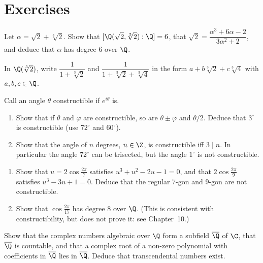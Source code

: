 \section{Exercises}

\begin{exercise}[$\star$]\label{ex:sqrt23}
Let $\alpha=\sqrt2+\sqrt[3]2$. Show that $[\Q(\sqrt2,\sqrt[3]2):\Q]=6$, that $\sqrt2=\dfrac{\alpha^3+6\alpha-2}{3\alpha^2+2}$, and deduce that $\alpha$ has degree $6$ over $\Q$.
\end{exercise}

\begin{exercise}[$\star$]\label{ex:inverse}
In $\Q(\sqrt[3]2)$, write $\dfrac1{1+\sqrt[3]2}$ and $\dfrac1{1+\sqrt[3]2+\sqrt[3]4}$ in the form $a+b\sqrt[3]2+c\sqrt[3]4$ with $a,b,c\in\Q$.
\end{exercise}

\begin{exercise}[$\star\star$]\label{ex:classical}
Call an angle $\theta$ constructible if $e^{i\theta}$ is.
\begin{enumerate}[label=(\alph*)]
\item Show that if $\theta$ and $\varphi$ are constructible, so are $\theta\pm\varphi$ and $\theta/2$. Deduce that $3^\circ$ is constructible (use $72^\circ$ and $60^\circ$).
\item Show that the angle of $n$ degrees, $n\in\Z$, is constructible iff $3\mid n$. In particular the angle $72^\circ$ can be trisected, but the angle $1^\circ$ is not constructible.
\end{enumerate}
\end{exercise}

\begin{exercise}[$\star\star$]\label{ex:polygons}
\begin{enumerate}[label=(\alph*)]
\item Show that $u=2\cos\frac{2\pi}7$ satisfies $u^3+u^2-2u-1=0$, and that $2\cos\frac{2\pi}9$ satisfies $u^3-3u+1=0$. Deduce that the regular $7$-gon and $9$-gon are not constructible.
\item Show that $\cos\frac{2\pi}{17}$ has degree $8$ over $\Q$. (This is consistent with constructibility, but does not prove it: see Chapter~10.)
\end{enumerate}
\end{exercise}

\begin{exercise}[$\star\star$]\label{ex:algfield}
Show that the complex numbers algebraic over $\Q$ form a subfield $\overline{\Q}$ of $\C$, that $\overline{\Q}$ is countable, and that a complex root of a non-zero polynomial with coefficients in $\overline{\Q}$ lies in $\overline{\Q}$. Deduce that transcendental numbers exist.
\end{exercise}


